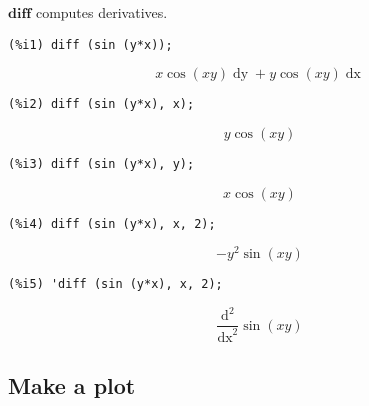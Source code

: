 \documentclass[12pt,leqno]{article}
\begin{document}
$\mathbf{diff}$ computes derivatives.
\begin{verbatim}
(%i1) diff (sin (y*x));
\end{verbatim}
\begin{dmath}[number={\(\mathop{\mathrm{\%o}_{1}}\)}]
x \cos \left(x y\right) \mathop{dy}+y \cos \left(x y\right) \mathop{dx}
\end{dmath}
\begin{verbatim}
(%i2) diff (sin (y*x), x);
\end{verbatim}
\begin{dmath}[number={\(\mathop{\mathrm{\%o}_{2}}\)}]
y \cos \left(x y\right)
\end{dmath}
\begin{verbatim}
(%i3) diff (sin (y*x), y);
\end{verbatim}
\begin{dmath}[number={\(\mathop{\mathrm{\%o}_{3}}\)}]
x \cos \left(x y\right)
\end{dmath}
\begin{verbatim}
(%i4) diff (sin (y*x), x, 2);
\end{verbatim}
\begin{dmath}[number={\(\mathop{\mathrm{\%o}_{4}}\)}]
-{y}^{2} \sin \left(x y\right)
\end{dmath}
\begin{verbatim}
(%i5) 'diff (sin (y*x), x, 2);
\end{verbatim}
\begin{dmath}[number={\(\mathop{\mathrm{\%o}_{5}}\)}]
\frac{\mathrm{d}^{2}}{\mathop{\mathrm{d}x}^{2}}\sin \left(x y\right)
\end{dmath}


\subsection{Make a plot}
\end{document}
